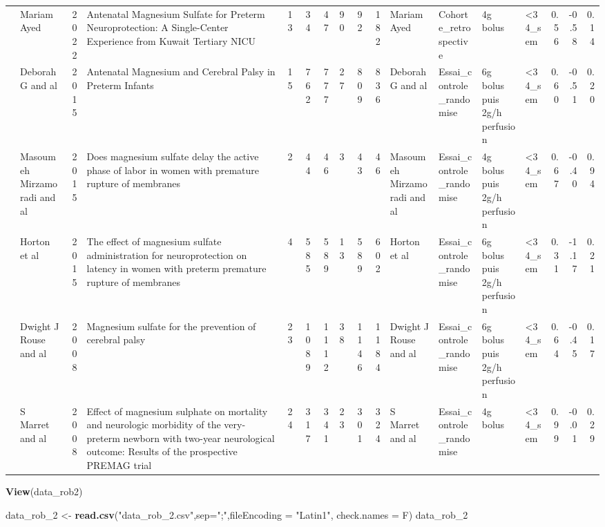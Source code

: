 \documentclass[
]{article}
\newenvironment{Shaded}{\begin{snugshade}}{\end{snugshade}}
\newcommand{\AttributeTok}[1]{\textcolor[rgb]{0.13,0.29,0.53}{#1}}
\newcommand{\FunctionTok}[1]{\textcolor[rgb]{0.13,0.29,0.53}{\textbf{#1}}}
\newcommand{\NormalTok}[1]{#1}
\newcommand{\OtherTok}[1]{\textcolor[rgb]{0.56,0.35,0.01}{#1}}
\newcommand{\StringTok}[1]{\textcolor[rgb]{0.31,0.60,0.02}{#1}}
\begin{document}
\begin{table}[H]
{\begin{tabular}[t]{>{\raggedleft\arraybackslash}p{4cm}lrlrrrrrrllllrrr}
8 & Mariam Ayed & 2022 & Antenatal Magnesium Sulfate for Preterm Neuroprotection: A Single-Center Experience from Kuwait Tertiary NICU & 13 & 34 & 47 & 90 & 92 & 182 & Mariam Ayed & Cohorte_retrospective & 4g bolus & <34_sem & 0.56 & -0.58 & 0.14\\
9 & Deborah G and al & 2015 & Antenatal Magnesium and Cerebral Palsy in Preterm Infants & 15 & 762 & 777 & 27 & 809 & 836 & Deborah G and al & Essai_controle_randomise & 6g bolus puis 2g/h perfusion & <34_sem & 0.60 & -0.51 & 0.20\\
10 & Masoumeh Mirzamoradi and al & 2015 & Does magnesium sulfate delay the active phase of labor in women with premature rupture of membranes & 2 & 44 & 46 & 3 & 43 & 46 & Masoumeh Mirzamoradi and al & Essai_controle_randomise & 4g bolus puis 2g/h perfusion & <34_sem & 0.67 & -0.40 & 0.94\\
11 & Horton et al & 2015 & The effect of magnesium sulfate administration for neuroprotection on latency in   women with preterm premature rupture of membranes & 4 & 585 & 589 & 13 & 589 & 602 & Horton et al & Essai_controle_randomise & 6g bolus puis 2g/h perfusion & <34_sem & 0.31 & -1.17 & 0.21\\
12 & Dwight J Rouse and al & 2008 & Magnesium sulfate for the prevention of cerebral palsy & 23 & 1089 & 1112 & 38 & 1146 & 1184 & Dwight J Rouse and al & Essai_controle_randomise & 6g bolus puis 2g/h perfusion & <34_sem & 0.64 & -0.45 & 0.17\\
13 & S Marret and al & 2008 & Effect of magnesium sulphate on mortality and neurologic morbidity of the very-preterm newborn with two-year neurological outcome: Results of the prospective PREMAG trial & 24 & 317 & 341 & 23 & 301 & 324 & S Marret and al & Essai_controle_randomise & 4g bolus & <34_sem & 0.99 & -0.01 & 0.29\\
\bottomrule
\end{tabular}}
\end{table}

\begin{Shaded}
\begin{Highlighting}[]
\FunctionTok{View}\NormalTok{(data\_rob2)}
\end{Highlighting}
\end{Shaded}

\begin{Shaded}
\begin{Highlighting}[]
\NormalTok{data\_rob\_2 }\OtherTok{\textless{}{-}} \FunctionTok{read.csv}\NormalTok{(}\StringTok{"data\_rob\_2.csv"}\NormalTok{,}\AttributeTok{sep=}\StringTok{";"}\NormalTok{,}\AttributeTok{fileEncoding =} \StringTok{"Latin1"}\NormalTok{, }\AttributeTok{check.names =}\NormalTok{ F)}
\NormalTok{data\_rob\_2}
\end{Highlighting}
\end{Shaded}
\end{document}
